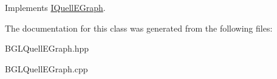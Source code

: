 Implements \hyperlink{a00076_a6ff128af05ee8ed24ce85d71af3cd0a0}{I\+Quell\+E\+Graph}.



The documentation for this class was generated from the following files\+:\begin{DoxyCompactItemize}
\item 
B\+G\+L\+Quell\+E\+Graph.\+hpp\item 
B\+G\+L\+Quell\+E\+Graph.\+cpp\end{DoxyCompactItemize}
